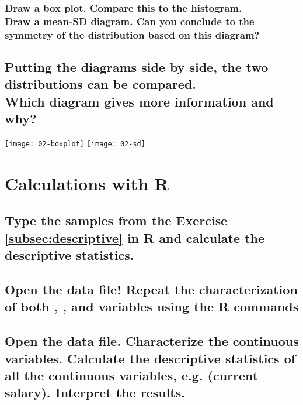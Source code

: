 	\subsubsection*{Draw a box plot. Compare this to the histogram.\\
	Draw a mean-SD diagram. Can you conclude to the symmetry of the distribution based on this diagram?}
	\vspace{10em}

\subsection[Putting the diagrams side by side, the two distributions can be compared.]{Putting the diagrams side by side, the two distributions can be compared.\\ Which diagram gives more information and why?}

	\begin{center}
	\texttt{[image: 02-boxplot]}
	\hspace{4em}
	\texttt{[image: 02-sd]}
	\end{center}
	
\section{Calculations with R}

\subsection{Type the samples from the Exercise \ref{subsec:descriptive} in  R and calculate the descriptive statistics.}


\subsection{Open the  data file!	
	Repeat the characterization of both , ,  and  variables using the R commands}
	

\subsection{Open the  data file. Characterize the continuous variables. Calculate the descriptive statistics of all the continuous variables, e.g.  (current salary). Interpret the results.}




